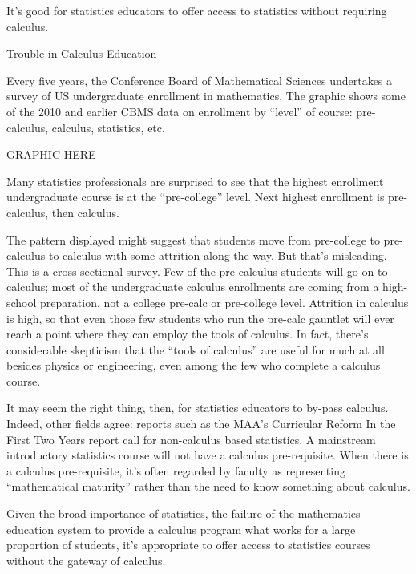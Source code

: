 It's good for statistics educators to offer access to statistics without requiring calculus.  


Trouble in Calculus Education 

Every five years, the Conference Board of Mathematical Sciences undertakes a survey of US undergraduate enrollment in mathematics.  The graphic shows some of the 2010 and earlier CBMS data on enrollment by ``level'' of course: pre-calculus, calculus, statistics, etc.

GRAPHIC HERE

Many statistics professionals are surprised to see that the highest enrollment undergraduate course is at the ``pre-college'' level.   Next highest enrollment is pre-calculus, then calculus.  

The pattern displayed might suggest that students move from pre-college to pre-calculus to calculus with some attrition along the way.  But that's misleading.  This is a cross-sectional survey.  Few of the pre-calculus students will go on to calculus; most of the undergraduate calculus enrollments are coming from a high-school preparation, not a college pre-calc or pre-college level.  Attrition in calculus is high, so that even those few students who run the pre-calc gauntlet will ever reach a point where they can employ the tools of calculus.  In fact, there's considerable skepticism that the ``tools of calculus'' are useful for much at all besides physics or engineering, even among the few who complete a calculus course.

It may seem the right thing, then, for statistics educators to by-pass calculus.  Indeed, other fields agree: reports such as the MAA's Curricular Reform In the First Two Years report call for non-calculus based statistics.  A mainstream introductory statistics course will not have a calculus pre-requisite.  When there is a calculus pre-requisite, it's often regarded by faculty as representing ``mathematical maturity'' rather than the need to know something about calculus.

Given the broad importance of statistics, the failure of the mathematics education system to provide a calculus program what works for a large proportion of students, it's appropriate to offer access to statistics courses without the gateway of calculus.  



